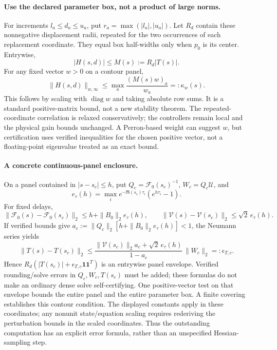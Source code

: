 \documentclass[11pt]{article}
\newcommand{\diag}{\operatorname{diag}}
\newcommand{\one}{\mathbf{1}}
\begin{document}
\paragraph{Use the declared parameter box, not a product of large norms.}
For increments $l_a\le d_a\le u_a$, put
$r_a=\max(|l_a|,|u_a|)$. Let $R_d$ contain these nonnegative
displacement radii, repeated for the two occurrences of each
replacement coordinate. They equal box half-widths only when
$p_0$ is its center. Entrywise,
\[
 |H(s,d)|\le M(s):=R_d|T(s)|.
\]
For any fixed vector $w>0$ on a contour panel,
\begin{equation}
 \|H(s,d)\|_{w,\infty}
 \le \max_a\frac{(M(s)w)_a}{w_a}
 =:\kappa_w(s). \label{eq:positive-envelope}
\end{equation}
This follows by scaling with $\diag w$ and taking absolute row sums.
It is a standard positive-matrix bound, not a new stability theorem.
The repeated-coordinate correlation is relaxed conservatively;
the controllers remain local and the physical gain bounds unchanged.
A Perron-based weight can suggest $w$, but certification uses verified
inequalities for the chosen positive vector, not a floating-point
eigenvalue treated as an exact bound.

\paragraph{A concrete continuous-panel enclosure.}
On a panel contained in $|s-s_c|\le h$, put
$Q_c=\mathcal F_0(s_c)^{-1}$,
$W_c=Q_c\mathcal U$, and
\[
 e_\tau(h)=\max_i e^{-\Re(s_c)\tau_i}
                     (e^{h\tau_i}-1).
\]
For fixed delays,
\[
 \|\mathcal F_0(s)-\mathcal F_0(s_c)\|_2
 \le h+\|B_0\|_2e_\tau(h),\qquad
 \|\mathcal V(s)-\mathcal V(s_c)\|_2\le\sqrt2\,e_\tau(h).
\]
If verified bounds give
$a_c:=\|Q_c\|_2[h+\|B_0\|_2e_\tau(h)]<1$,
the Neumann series yields
\begin{equation}
 \|T(s)-T(s_c)\|_2
 \le
 \frac{\|\mathcal V(s_c)\|_2 a_c+\sqrt2\,e_\tau(h)}
      {1-a_c}\,\|W_c\|_2=:\epsilon_{T,c}. \label{eq:panel}
\end{equation}
Hence $R_d(|T(s_c)|+\epsilon_{T,c}\one\one^T)$ is an
entrywise panel envelope. Verified rounding/solve errors in
$Q_c,W_c,T(s_c)$ must be added; these formulas do not make an
ordinary dense solve self-certifying.
One positive-vector test on that envelope bounds the entire panel
and the entire parameter box. A finite covering establishes this contour condition. The displayed constants
apply in these coordinates; any nonunit state/equation scaling requires
rederiving the perturbation bounds in the scaled coordinates.
Thus the outstanding computation has an explicit error formula,
rather than an unspecified Hessian-sampling step.
\end{document}
